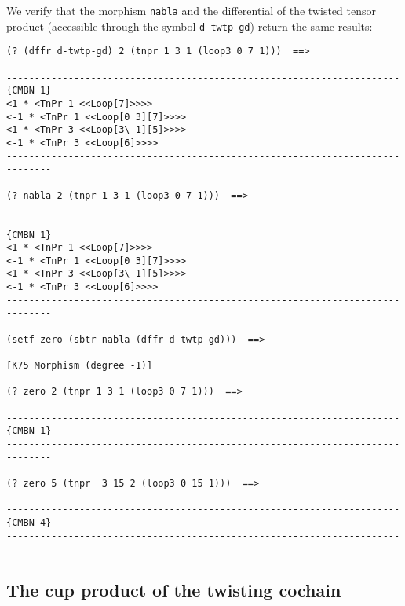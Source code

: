 We verify that the morphism {\tt nabla} and the differential of the 
twisted tensor product (accessible
through the symbol {\tt d-twtp-gd}) return the same results: 
{\footnotesize\begin{verbatim}
(? (dffr d-twtp-gd) 2 (tnpr 1 3 1 (loop3 0 7 1)))  ==>

----------------------------------------------------------------------{CMBN 1}
<1 * <TnPr 1 <<Loop[7]>>>>
<-1 * <TnPr 1 <<Loop[0 3][7]>>>>
<1 * <TnPr 3 <<Loop[3\-1][5]>>>>
<-1 * <TnPr 3 <<Loop[6]>>>>
------------------------------------------------------------------------------

(? nabla 2 (tnpr 1 3 1 (loop3 0 7 1)))  ==>

----------------------------------------------------------------------{CMBN 1}
<1 * <TnPr 1 <<Loop[7]>>>>
<-1 * <TnPr 1 <<Loop[0 3][7]>>>>
<1 * <TnPr 3 <<Loop[3\-1][5]>>>>
<-1 * <TnPr 3 <<Loop[6]>>>>
------------------------------------------------------------------------------

(setf zero (sbtr nabla (dffr d-twtp-gd)))  ==>

[K75 Morphism (degree -1)]

(? zero 2 (tnpr 1 3 1 (loop3 0 7 1)))  ==>

----------------------------------------------------------------------{CMBN 1}
------------------------------------------------------------------------------

(? zero 5 (tnpr  3 15 2 (loop3 0 15 1)))  ==>

----------------------------------------------------------------------{CMBN 4}
------------------------------------------------------------------------------
\end{verbatim}}

\newpage

\subsection {The cup product of the twisting cochain}

